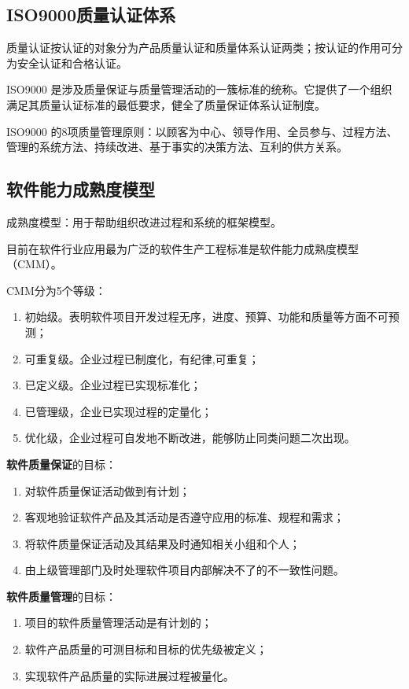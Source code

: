 \subsection{ISO9000质量认证体系}
质量认证按认证的对象分为产品质量认证和质量体系认证两类；按认证的作用可分为安全认证和合格认证。
\par ISO9000 是涉及质量保证与质量管理活动的一簇标准的统称。它提供了一个组织满足其质量认证标准的最低要求，健全了质量保证体系认证制度。
\par  ISO9000 的8项质量管理原则：以顾客为中心、领导作用、全员参与、过程方法、管理的系统方法、持续改进、基于事实的决策方法、互利的供方关系。
\subsection{软件能力成熟度模型}
成熟度模型：用于帮助组织改进过程和系统的框架模型。
\par 目前在软件行业应用最为广泛的软件生产工程标准是软件能力成熟度模型（CMM）。
\par CMM分为5个等级：
\begin{enumerate}
	\item 初始级。表明软件项目开发过程无序，进度、预算、功能和质量等方面不可预测；
	\item 可重复级。企业过程已制度化，有纪律,可重复；
	\item 已定义级。企业过程已实现标准化；
	\item 已管理级，企业已实现过程的定量化；
	\item 优化级，企业过程可自发地不断改进，能够防止同类问题二次出现。
\end{enumerate}
\par \textbf{软件质量保证}的目标：
\begin{enumerate}
	\item 对软件质量保证活动做到有计划；
	\item 客观地验证软件产品及其活动是否遵守应用的标准、规程和需求；
	\item 将软件质量保证活动及其结果及时通知相关小组和个人；
	\item 由上级管理部门及时处理软件项目内部解决不了的不一致性问题。
\end{enumerate}
\par \textbf{软件质量管理}的目标：
\begin{enumerate}
	\item 项目的软件质量管理活动是有计划的；
	\item 软件产品质量的可测目标和目标的优先级被定义；
	\item 实现软件产品质量的实际进展过程被量化。
\end{enumerate}
